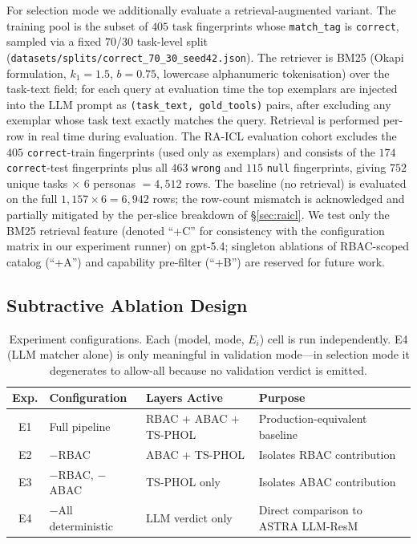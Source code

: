 \documentclass[10pt,a4paper,twocolumn]{article}
\begin{document}
For selection mode we additionally evaluate a retrieval-augmented variant. The training pool is the subset of $405$ task fingerprints whose \texttt{match\_tag} is \texttt{correct}, sampled via a fixed $70$/$30$ task-level split (\texttt{datasets/splits/correct\_70\_30\_seed42.json}). The retriever is BM25 (Okapi formulation, $k_1=1.5$, $b=0.75$, lowercase alphanumeric tokenisation) over the task-text field; for each query at evaluation time the top exemplars are injected into the LLM prompt as \texttt{(task\_text, gold\_tools)} pairs, after excluding any exemplar whose task text exactly matches the query. Retrieval is performed per-row in real time during evaluation. The RA-ICL evaluation cohort excludes the $405$ \texttt{correct}-train fingerprints (used only as exemplars) and consists of the $174$ \texttt{correct}-test fingerprints plus all $463$ \texttt{wrong} and $115$ \texttt{null} fingerprints, giving $752$ unique tasks $\times$ $6$ personas $= 4{,}512$ rows. The baseline (no retrieval) is evaluated on the full $1{,}157 \times 6 = 6{,}942$ rows; the row-count mismatch is acknowledged and partially mitigated by the per-slice breakdown of \S\ref{sec:raicl}. We test only the BM25 retrieval feature (denoted ``+C'' for consistency with the configuration matrix in our experiment runner) on gpt-5.4; singleton ablations of RBAC-scoped catalog (``+A'') and capability pre-filter (``+B'') are reserved for future work.

\subsection{Subtractive Ablation Design}
\label{sec:ablation_design}

\begin{table}[!t]
\centering
\caption{Experiment configurations. Each (model, mode, $E_i$) cell is run independently. E4 (LLM matcher alone) is only meaningful in validation mode---in selection mode it degenerates to allow-all because no validation verdict is emitted.}
\label{tab:experiments}
\scriptsize
\setlength{\tabcolsep}{3pt}
\begin{tabular}{@{}clll@{}}
\toprule
\textbf{Exp.} & \textbf{Configuration} & \textbf{Layers Active} & \textbf{Purpose} \\
\midrule
E1 & Full pipeline & RBAC + ABAC + TS-PHOL & Production-equivalent baseline \\
E2 & $-$RBAC & ABAC + TS-PHOL & Isolates RBAC contribution \\
E3 & $-$RBAC, $-$ABAC & TS-PHOL only & Isolates ABAC contribution \\
E4 & $-$All deterministic & LLM verdict only & Direct comparison to ASTRA LLM-ResM \\
\bottomrule
\end{tabular}
\end{table}
\end{document}
